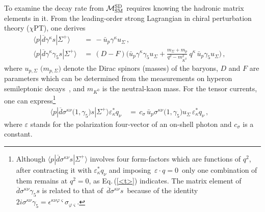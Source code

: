 \documentclass[amsmath,amssymb,aps,nofootinbib,prd,preprint,superscriptaddress,tightenlines,a4paper,bm]{revtex4-2}
\begin{document}
To examine the decay rate from ${\cal M}_{\rm SM}^{\rm SD}$ requires knowing the hadronic matrix elements in it.
From the leading-order strong Lagrangian in chiral perturbation theory ($\chi$PT), one derives~\cite{Tandean:2019tkm}
\begin{align} \label{<v>}
\langle p|\overline d\gamma^\kappa s|\Sigma^+\rangle & \,=\, -\bar u_p^{}\gamma^\kappa u_\Sigma^{} \,, &
\nonumber \\
\langle p|\overline d\gamma^\kappa\gamma_5^{}s|\Sigma^+\rangle & \,=\, (D-F) \Bigg(
\bar u_p^{}\gamma^\kappa\gamma_5^{} u_\Sigma^{} + \frac{m_{\Sigma}+m_p}{q^2-m_{K^0}^2}~ q^\kappa\, \bar u_p^{}\gamma_5^{}u_\Sigma^{} \Bigg) \,,
\end{align}
where $u_{p,\Sigma}$ $\big(m_{p,\Sigma}\big)$ denote the Dirac spinors (masses) of the baryons, $D$ and $F$ are parameters which can be determined from the measurements on hyperon semileptonic decays~\cite{Cabibbo:2003cu}, and $m_{K^0}$ is the neutral-kaon mass.
For the tensor currents, one can express\footnote{Although $\langle p|\overline d\sigma^{\kappa\nu}s|\Sigma^+\rangle$ involves four form-factors which are functions of $q^2$, after contracting it with $\varepsilon_\kappa^* q_\nu^{}$ and imposing \,$\varepsilon\cdot q=0$\, only one combination of them remains at $q^2=0$, as Eq.\,(\ref{<t>}) indicates.
The matrix element of \,$\overline d\sigma^{\kappa\nu}\gamma_5^{}s$ is related to that of \,$\overline d\sigma^{\kappa\nu}s$\, because of the identity
\,$2i\sigma^{\kappa\nu}\gamma_5^{}=\epsilon^{\kappa\nu\varphi\varsigma}\sigma_{\varphi\varsigma}$.\medskip}
\begin{align} \label{<t>}
\langle p|\overline d\sigma^{\kappa\nu}\big(1,\gamma_5^{}\big)s|\Sigma^+\rangle \varepsilon_\kappa^*q_\nu^{} & \,=\, c_\sigma^{}\, \bar u_p^{}\sigma^{\kappa\nu}\big(1,\gamma_5^{}\big)u_\Sigma^{}\, \varepsilon_\kappa^*q_\nu^{} \,, &
\end{align}
where $\varepsilon$ stands for the polarization four-vector of an on-shell photon and $c_\sigma^{}$ is a constant.
\end{document}
